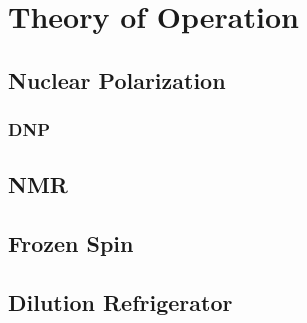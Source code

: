\chapter{Theory of Operation} 
\label{history} %
\section{Nuclear Polarization}  
 \subsection{DNP}

\section{NMR}

\section{Frozen Spin} 
 
\section{Dilution Refrigerator} 

